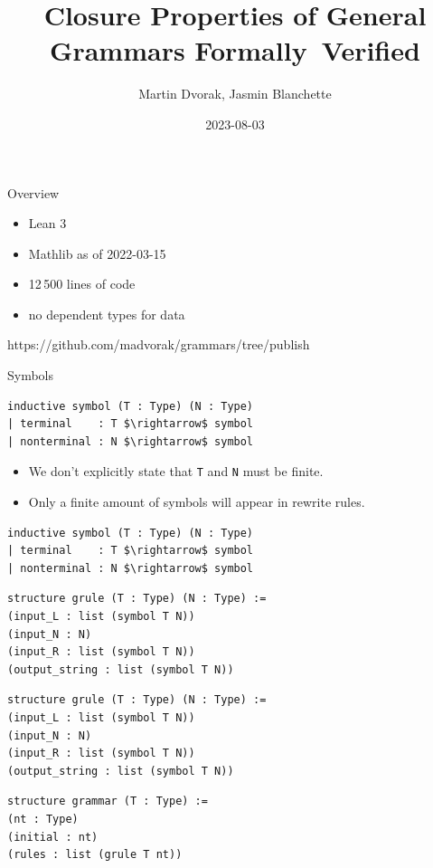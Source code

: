 \documentclass{beamer}
\title{Closure Properties of General Grammars Formally~Verified}
\author{Martin Dvorak, Jasmin Blanchette}
\date{2023-08-03}
\begin{document}
	
	\begin{frame}[plain]
		\maketitle
	\end{frame}
	
	\begin{frame}{Overview}
		\bigskip \bigskip \bigskip \bigskip
		\begin{itemize}
			\item Lean 3
			\item Mathlib as of 2022-03-15
			\item 12\,500 lines of code
			\item no dependent types for data
		\end{itemize}
		\bigskip \bigskip \bigskip \bigskip	\bigskip \bigskip \bigskip
		
		https://github.com/madvorak/grammars/tree/publish
	\end{frame}
	
	\begin{frame}[fragile]{Symbols}
\begin{lstlisting}
inductive symbol (T : Type) (N : Type)
| terminal    : T $\rightarrow$ symbol
| nonterminal : N $\rightarrow$ symbol
\end{lstlisting}
		\bigskip
		\pause
		\begin{itemize}
			\item We don't explicitly state that \texttt{T} and \texttt{N} must be finite.
			\item Only a finite amount of symbols will appear in rewrite rules.
		\end{itemize}
	\end{frame}

	\begin{frame}[fragile]{\only<2->{Rules}}
\begin{lstlisting}
inductive symbol (T : Type) (N : Type)
| terminal    : T $\rightarrow$ symbol
| nonterminal : N $\rightarrow$ symbol
\end{lstlisting}
\pause
\begin{lstlisting}
structure grule (T : Type) (N : Type) :=
(input_L : list (symbol T N))
(input_N : N)
(input_R : list (symbol T N))
(output_string : list (symbol T N))
\end{lstlisting}
	\end{frame}
	
	\begin{frame}[fragile]{\only<2->{Grammars}}
\begin{lstlisting}
structure grule (T : Type) (N : Type) :=
(input_L : list (symbol T N))
(input_N : N)
(input_R : list (symbol T N))
(output_string : list (symbol T N))
\end{lstlisting}
\pause
\begin{lstlisting}
structure grammar (T : Type) :=
(nt : Type)
(initial : nt)
(rules : list (grule T nt))
\end{lstlisting}
	\end{frame}
	
\end{document}
